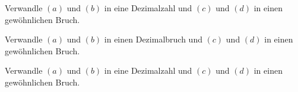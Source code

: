 \documentclass[11pt]{exam}
\begin{document}
\begin{questions}
\noaddpoints
\question[\totalpoints]
\addpoints
Verwandle $(a)$ und $(b)$ in eine Dezimalzahl und $(c)$ und $(d)$ in einen gewöhnlichen Bruch.


\noaddpoints
\question[\totalpoints]
\addpoints
Verwandle $(a)$ und $(b)$ in einen Dezimalbruch und $(c)$ und $(d)$ in einen gewöhnlichen Bruch.


\noaddpoints
\question[\totalpoints]
\addpoints
Verwandle $(a)$ und $(b)$ in eine Dezimalzahl und $(c)$ und $(d)$ in einen gewöhnlichen Bruch.
\end{questions}
\end{document}
